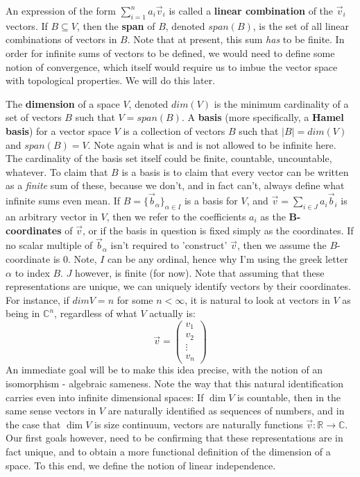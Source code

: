 \documentclass{article}
\theoremstyle{definition}
\theoremstyle{plain}
\theoremstyle{theorem}
\begin{document}
	\par An expression of the form $\sum_{i=1}^n a_i\vec{v}_i$ is called a \textbf{linear combination} of the $\vec{v}_i$ vectors. If $B \subseteq V$, then the \textbf{span} of $B$, denoted $span(B)$, is the set of all linear combinations of vectors in $B$. Note that at present, this sum \textit{has} to be finite. In order for infinite sums of vectors to be defined, we would need to define some notion of convergence, which itself would require us to imbue the vector space with topological properties. We will do this later.
	\par The \textbf{dimension} of a space $V$, denoted $dim(V)$ is the minimum cardinality of a set of vectors $B$ such that $V = span(B)$. A \textbf{basis} (more specifically, a \textbf{Hamel basis}) for a vector space $V$ is a collection of vectors $B$ such that $|B| = dim(V)$ and $span(B) = V$. Note again what is and is not allowed to be infinite here. The cardinality of the basis set itself could be finite, countable, uncountable, whatever. To claim that $B$ is a basis is to claim that every vector can be written as a \textit{finite} sum of these, because we don't, and in fact can't, always define what infinite sums even mean. If $B = \{\vec{b}_{\alpha}\}_{\alpha \in I}$ is a basis for $V$, and $\vec{v} = \sum_{i \in J} a_i\vec{b}_i$ is an arbitrary vector in $V$, then we refer to the coefficients $a_i$ as the \textbf{B-coordinates} of $\vec{v}$, or if the basis in question is fixed simply as the coordinates. If no scalar multiple of $\vec{b}_{\alpha}$ isn't required to 'construct' $\vec{v}$, then we assume the $B$-coordinate is $0$. Note, $I$ can be any ordinal, hence why I'm using the greek letter $\alpha$ to index $B$. $J$ however, is finite (for now). Note that assuming that these representations are unique, we can uniquely identify vectors by their coordinates. For instance, if $dim{V} = n$ for some $n < \infty$, it is natural to look at vectors in $V$ as being in $\mathbb{C}^n$, regardless of what $V$ actually is:
	\[ \vec{v} = \begin{pmatrix} v_1 \\ v_2 \\ \vdots \\ v_n \end{pmatrix} \]
	An immediate goal will be to make this idea precise, with the notion of an isomorphism - algebraic sameness. Note the way that this natural identification carries even into infinite dimensional spaces: If $\dim{V}$ is countable, then in the same sense vectors in $V$ are naturally identified as sequences of numbers, and in the case that $\dim{V}$ is size continuum, vectors are naturally functions $\vec{v}:\mathbb{R} \to \mathbb{C}$. Our first goals however, need to be confirming that these representations are in fact unique, and to obtain a more functional definition of the dimension of a space. To this end, we define the notion of linear independence. 
\end{document}
